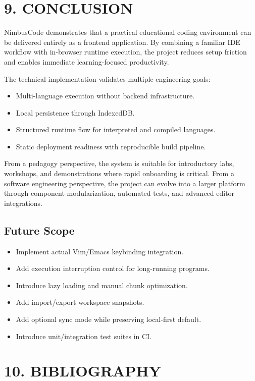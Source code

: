 \newpage
\section{9. CONCLUSION}

NimbusCode demonstrates that a practical educational coding environment can be delivered entirely as a frontend application. By combining a familiar IDE workflow with in-browser runtime execution, the project reduces setup friction and enables immediate learning-focused productivity.

The technical implementation validates multiple engineering goals:
\begin{itemize}[leftmargin=8mm]
\item Multi-language execution without backend infrastructure.
\item Local persistence through IndexedDB.
\item Structured runtime flow for interpreted and compiled languages.
\item Static deployment readiness with reproducible build pipeline.
\end{itemize}

From a pedagogy perspective, the system is suitable for introductory labs, workshops, and demonstrations where rapid onboarding is critical. From a software engineering perspective, the project can evolve into a larger platform through component modularization, automated tests, and advanced editor integrations.

\subsection*{Future Scope}
\begin{itemize}[leftmargin=8mm]
\item Implement actual Vim/Emacs keybinding integration.
\item Add execution interruption control for long-running programs.
\item Introduce lazy loading and manual chunk optimization.
\item Add import/export workspace snapshots.
\item Add optional sync mode while preserving local-first default.
\item Introduce unit/integration test suites in CI.
\end{itemize}

\newpage
\section{10. BIBLIOGRAPHY}

